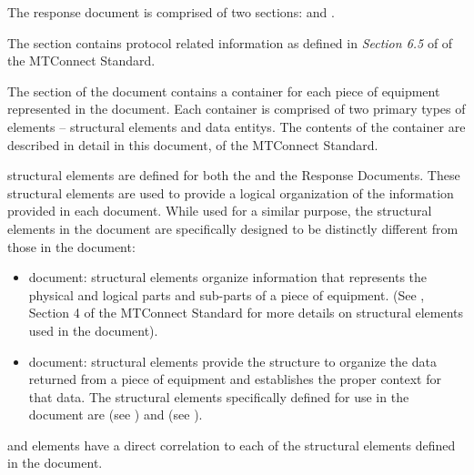 The  \gls{response document} is comprised of two sections:  and .

The  section contains protocol related information as defined in \textit{Section 6.5} of  of the MTConnect Standard.

The  section of the  document contains a  container for each piece of equipment represented in the document.  Each  container is comprised of two primary types of elements – \glspl{structural element} and \glspl{data entity}.  The contents of the  container are described in detail in this document,  of the MTConnect Standard.

\glspl{structural element} are defined for both the  and the  \glspl{Response Document}.  These \glspl{structural element} are used to provide a logical organization of the information provided in each document.  While used for a similar purpose, the \glspl{structural element} in the  document are specifically designed to be distinctly different from those in the  document:  


\begin{itemize}
    \item {} document: \glspl{structural element} organize information that represents the physical and logical parts and sub-parts of a piece of equipment.  (See , Section 4 of the MTConnect Standard for more details on \glspl{structural element} used in the  document).  

    \item {} document: \glspl{structural element} provide the structure to organize the data returned from a piece of equipment and establishes the proper context for that data.  The \glspl{structural element} specifically defined for use in the  document are  (see ) and  (see ).   

\end{itemize}

 and  elements have a direct correlation to each of the \glspl{structural element} defined in the  document.


